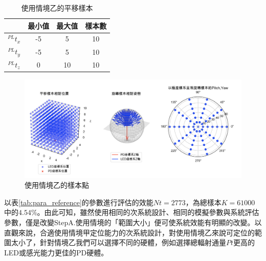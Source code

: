\begin{table}[htpb]
    \begin{center}
      \caption{使用情境乙的平移樣本}
      \label{tab:B_translate}
      \begin{tabular}{c|c|c|c} %
         & \textbf{最小值} & \textbf{最大值}&\textbf{樣本數}\\
        \hline
        $^{PL}t_x$ & -5 & 5&10\\
        $^{PL}t_y$ & -5 & 5&10\\
        $^{PL}t_z$ & 0 & 10 &10\\
      \end{tabular}
    \end{center}
  \end{table}


  

\begin{figure}[htpb]
    \centering
    \includegraphics[width=15cm]{ch4pic/b_scenario.png}
    \caption{使用情境乙的樣本點}
    \label{pic:b_scenario}
\end{figure}

以表\ref{tab:para_reference}的參數進行評估的效能$Nt=2773$，為總樣本$K=61000$中的$4.54\%$。由此可知，雖然使用相同的次系統設計、相同的模擬參數與系統評估參數，僅是改變StepA.使用情境的「範圍大小」便可使系統效能有明顯的改變。以直觀來說，合適使用情境甲定位能力的次系統設計，對使用情境乙來說可定位的範圍太小了，針對情境乙我們可以選擇不同的硬體，例如選擇總輻射通量$Pt$更高的LED或感光能力更佳的PD硬體。

